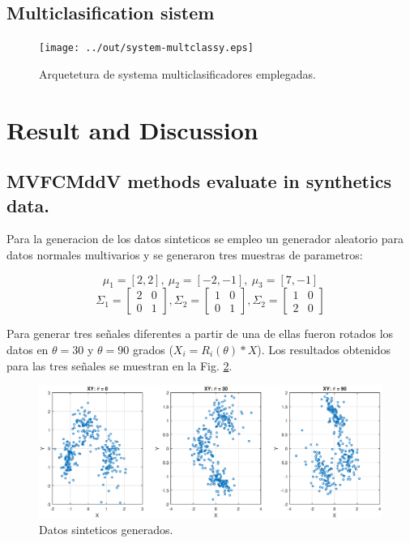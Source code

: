 \documentclass[12pt]{article}
\begin{document}
\subsection{Multiclasification sistem}


\begin{figure}[h]
\centering
\texttt{[image: ../out/system-multclassy.eps]}
\caption{Arquetetura de systema multiclasificadores emplegadas.}
\label{fig:mult_system_classy}
\end{figure}  



\section{Result and Discussion }


\subsection{MVFCMddV methods evaluate in synthetics data.}

Para la generacion de los datos sinteticos se empleo un generador aleatorio para datos normales multivarios y se generaron tres muestras de parametros: 

$$\mu_1 = [2, 2], \ \mu_2 = [-2, -1], \ \mu_3 = [7, -1] $$
$$\Sigma_1 = \left[ \begin{matrix}
2 & 0 \\ 
0 & 1
\end{matrix} \right], 
\Sigma_2 = \left[ \begin{matrix}
1 & 0 \\ 
0 & 1
\end{matrix} \right], 
\Sigma_2 = \left[ \begin{matrix}
1 & 0 \\ 
2 & 0
\end{matrix} \right] $$

Para generar tres señales diferentes a partir de una de ellas fueron rotados los datos en $\theta = 30$ y $\theta = 90$ grados ($X_i = R_i(\theta)*X$). Los resultados obtenidos para las tres señales se muestran en la Fig. \ref{fig:xy_sinteticos}.

\begin{figure}[h]
\centering
\includegraphics[width=4.5in]{../out/xy-sinteticos.eps}
\caption{Datos sinteticos generados.}
\label{fig:xy_sinteticos}
\end{figure}  
\end{document}
